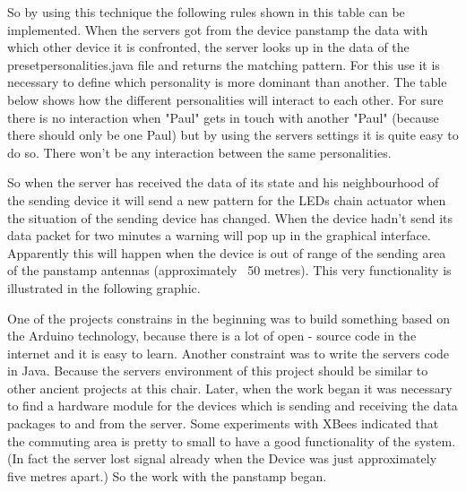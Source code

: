 So by using this technique the following rules shown in this table can be implemented.
When the servers got from the device panstamp the data with which other device it is confronted, the server looks up in the data of the presetpersonalities.java file and returns the matching pattern. For this use it is necessary to define which personality is more dominant than another.
The table below shows how the different personalities will interact to each other.
For sure there is no interaction when "Paul" gets in touch with another "Paul" (because there should only be one Paul) but by using the servers settings it is quite easy to do so. There won't be any interaction between the same personalities.

So when the server has received the data of its state and his neighbourhood of the sending device it will send a new pattern for the LEDs chain actuator when the situation of the sending device has changed.
When the device hadn't send its data packet for two minutes a warning will pop up in the graphical interface. Apparently this will happen when the device is out of range of the sending area of the panstamp antennas (approximately ~50 metres).
This very functionality is illustrated in the following graphic.
 
One of the projects constrains in the beginning was to build something based on the Arduino technology, because there is a lot of open - source code in the internet and it is easy to learn.
Another constraint was to write the servers code in Java. Because the servers environment of this project should be similar to other ancient projects at this chair.
Later, when the work began it was necessary to find a hardware module for the devices which is sending and receiving the data packages to and from the server. Some experiments with XBees indicated that the commuting area is pretty to small to have a good functionality of the system. (In fact the server lost signal already when the Device was just approximately five metres apart.) So the work with the panstamp began.   
 

